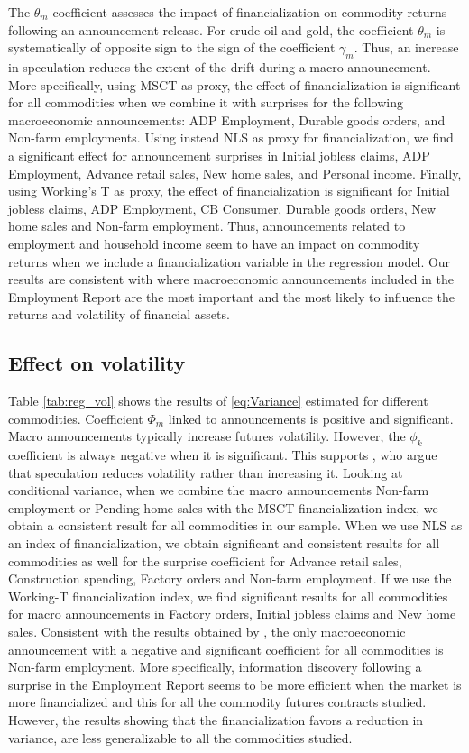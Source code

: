 \documentclass[12pt]{article}
\begin{document}
The $\theta_m$ coefficient assesses the impact of financialization on commodity returns following an announcement release. For crude oil and gold, the coefficient $\theta_m$ is systematically of opposite sign to the sign of the coefficient $\gamma_m$. Thus, an increase in speculation reduces the extent of the drift during a macro  announcement. More specifically, using MSCT as proxy, the effect of financialization is significant for all commodities when we combine it with surprises for the following macroeconomic announcements: ADP Employment, Durable goods orders, and Non-farm employments. Using instead NLS as proxy for financialization, we find a significant effect for announcement surprises in Initial jobless claims, ADP Employment, Advance retail sales, New home sales, and Personal income. Finally, using Working's T as proxy, the effect of financialization is significant for  Initial jobless claims, ADP Employment, CB Consumer, Durable goods orders, New home sales and Non-farm employment. Thus,  announcements related to employment and household income seem to have an impact on commodity returns when we include a financialization variable in the regression model. Our results are consistent with \citet{hordahl2015expectations} where macroeconomic announcements included in the Employment Report are the most important and the most likely to influence the returns and  volatility of financial assets.
  
	\subsection{Effect on volatility}
	Table \ref{tab:reg_vol} shows the results of \eqref{eq:Variance} estimated for different commodities.   Coefficient $\Phi_m$ linked to announcements is positive and significant.  Macro announcements typically increase futures volatility. However, the $\phi_k$ coefficient  is always negative when it is significant. This supports \citet{brunetti2016speculators}, who argue that speculation reduces volatility rather than increasing it. Looking at conditional variance, when we combine the macro  announcements Non-farm employment or Pending home sales with the MSCT financialization index, we obtain a consistent result for all commodities in our sample. When we use NLS as an index of financialization, we obtain significant and consistent results for all commodities as well for the surprise coefficient for Advance retail sales, Construction spending, Factory orders and Non-farm employment.
If we use the Working-T financialization index, we find significant results for all commodities for macro announcements in Factory orders, Initial jobless claims and New home sales. Consistent with the results obtained by \citet{hordahl2015expectations}, the only macroeconomic announcement with a negative and significant coefficient for all commodities is Non-farm employment. More specifically, information discovery following a surprise in the Employment Report seems to be more efficient when the market is more financialized and this for all the commodity futures contracts studied. However, the results showing that the financialization favors a reduction in variance, are less generalizable to all the commodities studied.
\end{document}
